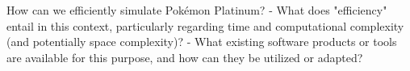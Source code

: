 How can we efficiently simulate Pokémon Platinum?
- What does "efficiency" entail in this context, particularly regarding time and computational complexity (and potentially space complexity)?  
- What existing software products or tools are available for this purpose, and how can they be utilized or adapted?  